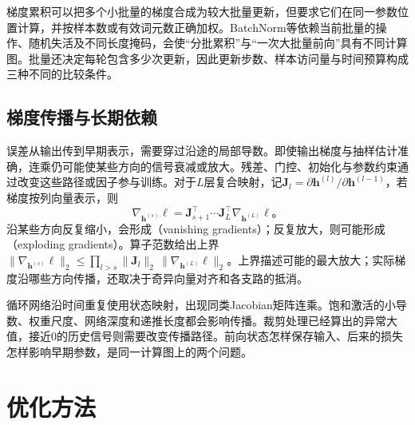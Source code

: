 梯度累积可以把多个小批量的梯度合成为较大批量更新，但要求它们在同一参数位置计算，并按样本数或有效词元数正确加权。BatchNorm等依赖当前批量的操作、随机失活及不同长度掩码，会使“分批累积”与“一次大批量前向”具有不同计算图。批量还决定每轮包含多少次更新，因此更新步数、样本访问量与时间预算构成三种不同的比较条件。

\subsection{梯度传播与长期依赖}
\label{sec:training-gradient-propagation}

误差从输出传到早期表示，需要穿过沿途的局部导数。即使输出梯度与抽样估计准确，连乘仍可能使某些方向的信号衰减或放大。残差、门控、初始化与参数约束通过改变这些路径或因子参与训练。对于$L$层复合映射，记$\bm J_l=\partial\bm h^{(l)}/\partial\bm h^{(l-1)}$，若梯度按列向量表示，则
\begin{equation}
  \nabla_{\bm h^{(s)}}\ell
  =\bm J_{s+1}^{\top}\cdots\bm J_L^{\top}
    \nabla_{\bm h^{(L)}}\ell\text{。}
  \label{eq:training-jacobian-chain}
\end{equation}
沿某些方向反复缩小，会形成（vanishing gradients）；反复放大，则可能形成（exploding gradients）。算子范数给出上界$\lVert\nabla_{\bm h^{(s)}}\ell\rVert_2\leq\prod_{l>s}\lVert\bm J_l\rVert_2\,\lVert\nabla_{\bm h^{(L)}}\ell\rVert_2$。上界描述可能的最大放大；实际梯度沿哪些方向传播，还取决于奇异向量对齐和各支路的抵消。

循环网络沿时间重复使用状态映射，出现同类Jacobian矩阵连乘。饱和激活的小导数、权重尺度、网络深度和递推长度都会影响传播。裁剪处理已经算出的异常大值，接近0的历史信号则需要改变传播路径。前向状态怎样保存输入、后来的损失怎样影响早期参数，是同一计算图上的两个问题。

\section{优化方法}
\label{sec:training-optimizers}

